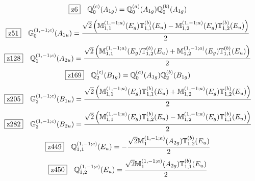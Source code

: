 \documentclass[fleqn,10pt,landscape]{jsarticle}
\begin{document}
\begin{dmath*}
\hspace*{3mm}\fbox{z6}\quad \mathbb{Q}_{0}^{(c)}(A_{1g})=\mathbb{Q}_{0}^{(a)}(A_{1g}) \mathbb{Q}_{0}^{(b)}(A_{1g})
\end{dmath*}
\begin{dmath*}
\hspace*{3mm}\fbox{z51}\quad \mathbb{G}_{0}^{(1,-1;c)}(A_{1u})=\frac{\sqrt{2} \left(\mathbb{M}_{1,1}^{(1,-1;a)}(E_{g}) \mathbb{T}_{1,1}^{(b)}(E_{u}) - \mathbb{M}_{1,2}^{(1,-1;a)}(E_{g}) \mathbb{T}_{1,2}^{(b)}(E_{u})\right)}{2}
\end{dmath*}
\begin{dmath*}
\hspace*{3mm}\fbox{z128}\quad \mathbb{Q}_{1}^{(1,-1;c)}(A_{2u})=\frac{\sqrt{2} \left(\mathbb{M}_{1,1}^{(1,-1;a)}(E_{g}) \mathbb{T}_{1,2}^{(b)}(E_{u}) + \mathbb{M}_{1,2}^{(1,-1;a)}(E_{g}) \mathbb{T}_{1,1}^{(b)}(E_{u})\right)}{2}
\end{dmath*}
\begin{dmath*}
\hspace*{3mm}\fbox{z169}\quad \mathbb{Q}_{2}^{(c)}(B_{1g})=\mathbb{Q}_{0}^{(a)}(A_{1g}) \mathbb{Q}_{2}^{(b)}(B_{1g})
\end{dmath*}
\begin{dmath*}
\hspace*{3mm}\fbox{z205}\quad \mathbb{G}_{2}^{(1,-1;c)}(B_{1u})=\frac{\sqrt{2} \left(\mathbb{M}_{1,1}^{(1,-1;a)}(E_{g}) \mathbb{T}_{1,1}^{(b)}(E_{u}) + \mathbb{M}_{1,2}^{(1,-1;a)}(E_{g}) \mathbb{T}_{1,2}^{(b)}(E_{u})\right)}{2}
\end{dmath*}
\begin{dmath*}
\hspace*{3mm}\fbox{z282}\quad \mathbb{G}_{2}^{(1,-1;c)}(B_{2u})=\frac{\sqrt{2} \left(\mathbb{M}_{1,1}^{(1,-1;a)}(E_{g}) \mathbb{T}_{1,2}^{(b)}(E_{u}) - \mathbb{M}_{1,2}^{(1,-1;a)}(E_{g}) \mathbb{T}_{1,1}^{(b)}(E_{u})\right)}{2}
\end{dmath*}
\begin{dmath*}
\hspace*{3mm}\fbox{z449}\quad \mathbb{Q}_{1,1}^{(1,-1;c)}(E_{u})=- \frac{\sqrt{2} \mathbb{M}_{1}^{(1,-1;a)}(A_{2g}) \mathbb{T}_{1,2}^{(b)}(E_{u})}{2}
\end{dmath*}
\begin{dmath*}
\hspace*{3mm}\fbox{z450}\quad \mathbb{Q}_{1,2}^{(1,-1;c)}(E_{u})=\frac{\sqrt{2} \mathbb{M}_{1}^{(1,-1;a)}(A_{2g}) \mathbb{T}_{1,1}^{(b)}(E_{u})}{2}
\end{dmath*}
\vspace{5mm}
\end{document}
